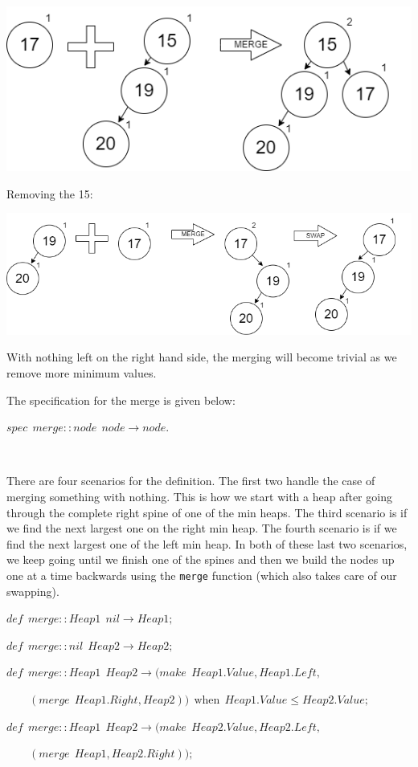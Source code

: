 \documentclass[
]{book}
\begin{document}
\includegraphics{images/heap_del7.drawio.png}

Removing the 15:

\includegraphics{images/heap_del8.drawio.png}

With nothing left on the right hand side, the merging will become trivial as we remove more minimum values.

The specification for the merge is given below:

\begin{formulabox}
\(spec ~ ~ merge :: node ~ ~ node \rightarrow node.\)

\end{formulabox}

\(\nonumber\)

There are four scenarios for the definition. The first two handle the case of merging something with nothing. This is how we start with a heap after going through the complete right spine of one of the min heaps. The third scenario is if we find the next largest one on the right min heap. The fourth scenario is if we find the next largest one of the left min heap. In both of these last two scenarios, we keep going until we finish one of the spines and then we build the nodes up one at a time backwards using the \texttt{merge} function (which also takes care of our swapping).

\begin{formulabox}
\(\mathit{def} ~ ~ merge :: Heap1 ~ ~ nil \rightarrow Heap1;\)

\(\mathit{def} ~ ~ merge :: nil ~ ~ Heap2 \rightarrow Heap2;\)

\(\mathit{def} ~ ~ merge :: Heap1 ~ ~ Heap2 \rightarrow (make ~ ~ Heap1.Value, Heap1.Left,\)

\(\quad \quad (merge ~ ~ Heap1.Right, Heap2)) ~ ~ \text{when} ~ ~ Heap1.Value \leq Heap2.Value;\)

\(\mathit{def} ~ ~ merge :: Heap1 ~ ~ Heap2 \rightarrow (make ~ ~ Heap2.Value, Heap2.Left,\)

\(\quad \quad (merge ~ ~ Heap1, Heap2.Right));\)

\end{formulabox}
\end{document}
